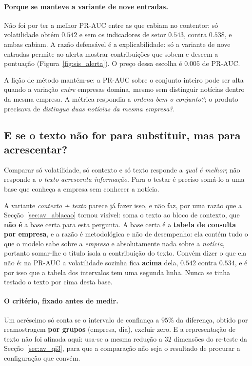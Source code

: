 \paragraph{Porque se manteve a variante de nove entradas.}
Não foi por ter a melhor PR-AUC entre as que cabiam no contentor: só volatilidade obtém $0.542$ e
sem os indicadores de setor $0.543$, contra $0.538$, e ambas cabiam. A razão defensável é a
explicabilidade: só a variante de nove entradas permite ao alerta mostrar contribuições que sobem e
descem a pontuação (Figura~\ref{fig:sis_alerta}). O preço dessa escolha é $0.005$ de PR-AUC.

A lição de método mantém-se: a PR-AUC sobre o conjunto inteiro pode ser alta quando a variação
\emph{entre} empresas domina, mesmo sem distinguir notícias dentro da mesma empresa. A métrica
respondia a \emph{ordena bem o conjunto?}; o produto precisava de \emph{distingue duas notícias da
mesma empresa?}.

\subsection{E se o texto não for para substituir, mas para acrescentar?}
\label{sec:av_acrescimo}

Comparar só volatilidade, só contexto e só texto responde a \emph{qual é melhor}; não responde a
\emph{o texto acrescenta informação}. Para o testar é preciso somá-lo a uma base que conheça a
empresa sem conhecer a notícia.

A variante \emph{contexto + texto} parece já fazer isso, e não faz, por uma razão que a
Secção~\ref{sec:av_ablacao} tornou visível: soma o texto ao bloco de contexto, que \textbf{não é}
a base certa para esta pergunta. A base certa é a \textbf{tabela de consulta por empresa}, e a
razão é metodológica e não de desempenho: ela contém tudo o que o modelo sabe sobre a
\emph{empresa} e absolutamente nada sobre a \emph{notícia}, portanto somar-lhe o título isola a
contribuição do texto. Convém dizer o que ela não é: na PR-AUC a volatilidade sozinha fica
\textbf{acima} dela, $0.542$ contra $0.534$, e é por isso que a tabela dos intervalos tem uma
segunda linha. Nunca se tinha testado o texto por cima desta base.

\paragraph{O critério, fixado antes de medir.} Um acréscimo só conta se o intervalo de confiança
a $95\%$ da diferença, obtido por reamostragem \textbf{por grupos} (empresa, dia), excluir zero. E
a representação de texto não foi afinada aqui: usa-se a mesma redução a $32$ dimensões do
re-teste da Secção~\ref{sec:av_qi3}, para que a comparação não seja o resultado de procurar a
configuração que convém.

